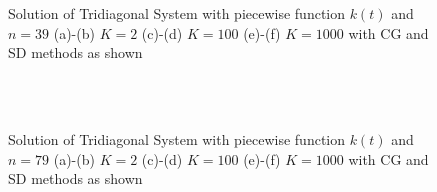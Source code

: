 \documentclass[11pt]{article}
\begin{document}
\begin{figure}
     \centering
    		 \subfloat[][]{ \label{n_39_CG_K_2_part_b}}
     		 \subfloat[][]{ \label{n_39_SD_K_2_part_b}}
\\
    		 \subfloat[][]{ \label{n_39_CG_K_100_part_b}}
     		 \subfloat[][]{ \label{n_39_SD_K_100_part_b}}
\\
    		 \subfloat[][]{ \label{n_39_CG_K_1000_part_b}}
     		 \subfloat[][]{ \label{n_39_SD_K_1000_part_b}}
     \centering
     \caption{Solution of Tridiagonal System with piecewise function $k(t)$  and $n = 39$ (a)-(b) $K = 2$ (c)-(d) $K = 100$ (e)-(f) $K = 1000$ with CG and SD methods as shown}
     \label{Tradiagonal_linear}
\end{figure}
%
%
\newpage

\begin{figure}
     \centering
    		 \subfloat[][]{ \label{n_79_CG_K_2_part_b}}
     		 \subfloat[][]{ \label{n_79_SD_K_2_part_b}}
\\
    		 \subfloat[][]{ \label{n_79_CG_K_100_part_b}}
     		 \subfloat[][]{ \label{n_79_SD_K_100_part_b}}
\\
    		 \subfloat[][]{ \label{n_79_CG_K_1000_part_b}}
     		 \subfloat[][]{ \label{n_79_SD_K_1000_part_b}}
     \centering
     \caption{Solution of Tridiagonal System with piecewise function $k(t)$  and $n = 79$ (a)-(b) $K = 2$ (c)-(d) $K = 100$ (e)-(f) $K = 1000$ with CG and SD methods as shown}
     \label{Tradiagonal_piecewise}
\end{figure}
%
%
\newpage
\end{document}
